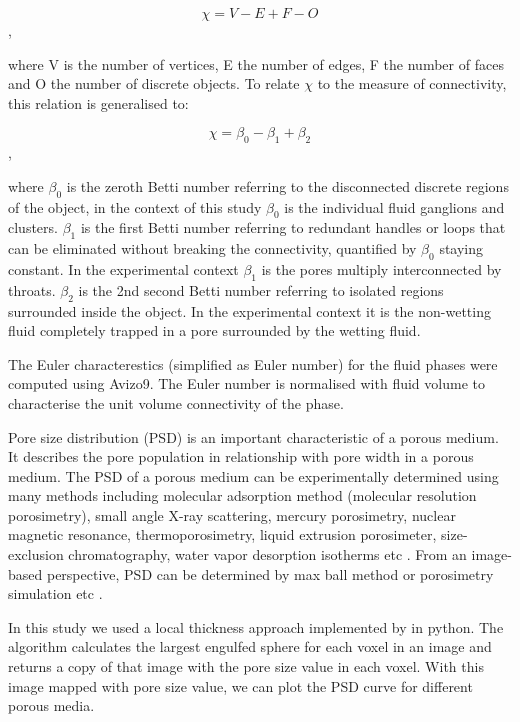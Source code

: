 $$\chi = V-E+F-O$$,

where V is the number of vertices, E the number of edges, F the number of faces and O the number of discrete objects. To relate $\chi$ to the measure of connectivity, this relation is generalised \citep{serra1986introduction,vogel2001quantitative,vogel2002topological} to: 

$$\chi=\beta_0-\beta_1+\beta_2$$,

where $\beta_0$ is the zeroth Betti number referring to the disconnected discrete regions of the object, in the context of this study $\beta_0$ is the individual fluid ganglions and clusters. $\beta_1$ is the first Betti number referring to redundant handles or loops that can be eliminated without breaking the connectivity, quantified by $\beta_0$ staying constant. In the experimental context $\beta_1$ is the pores multiply interconnected by throats. $\beta_2$ is the 2nd second Betti number referring to isolated regions surrounded inside the object. In the experimental context it is the non-wetting fluid completely trapped in a pore surrounded by the wetting fluid.

The Euler characterestics (simplified as Euler number) for the fluid phases were computed using Avizo9\texttrademark. The Euler number is normalised with fluid volume to characterise the unit volume connectivity of the phase.

Pore size distribution (PSD) is an important characteristic of a porous medium. It describes the pore population in relationship with pore width in a porous medium. The PSD of a porous medium can be experimentally determined using many methods including molecular adsorption method (molecular resolution porosimetry), small angle X-ray scattering, mercury porosimetry, nuclear magnetic resonance, thermoporosimetry, liquid extrusion porosimeter, size-exclusion chromatography, water vapor desorption isotherms etc \citep{kaneko1994determination, yang2009image}. From an image-based perspective, PSD can be determined by max ball method or porosimetry simulation etc \citep[e.g.]{delerue1999new,yang2009image,gostickporespy}. 

In this study we used a local thickness approach implemented by \cite{gostickporespy} in python. The algorithm calculates the largest engulfed sphere for each voxel in an image and returns a copy of that image with the pore size value in each voxel. With this image mapped with pore size value, we can plot the PSD curve for different porous media. 

